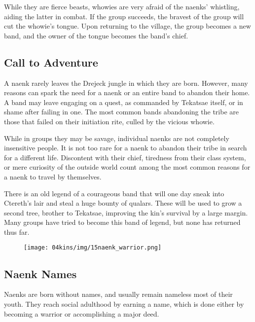     While they are fierce beasts, whowies are very afraid of the naenks' whistling, aiding the latter in combat.
    If the group succeeds, the bravest of the group will cut the whowie's tongue.
    Upon returning to the village, the group becomes a new band, and the owner of the tongue becomes the band's chief.

\subsection*{Call to Adventure}
    A naenk rarely leaves the Drejeck jungle in which they are born.
    However, many reasons can spark the need for a naenk or an entire band to abandon their home.
    A band may leave engaging on a quest, as commanded by Tekatsae itself, or in shame after failing in one.
    The most common bands abandoning the tribe are those that failed on their initiation rite, culled by the vicious whowie.

    While in groups they may be savage, individual naenks are not completely insensitive people.
    It is not too rare for a naenk to abandon their tribe in search for a different life.
    Discontent with their chief, tiredness from their class system, or mere curiosity of the outside world count among the most common reasons for a naenk to travel by themselves.


    There is an old legend of a courageous band that will one day sneak into Ctereth's lair and steal a huge bounty of qualars.
    These will be used to grow a second tree, brother to Tekatsae, improving the kin's survival by a large margin.
    Many groups have tried to become this band of legend, but none has returned thus far.

\begin{figure}[!b]
    \centering
    \texttt{[image: 04kins/img/15naenk\_warrior.png]}
\end{figure}

\subsection*{Naenk Names}
    Naenks are born without names, and usually remain nameless most of their youth.
    They reach social adulthood by earning a name, which is done either by becoming a warrior or accomplishing a major deed.

